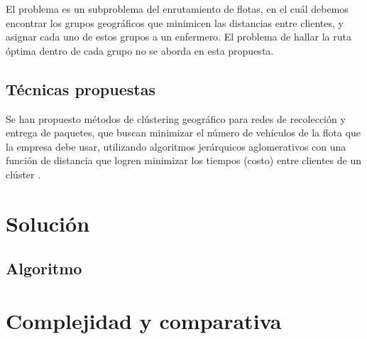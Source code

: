 \documentclass[runningheads]{llncs}
\begin{document}
El problema es un subproblema del enrutamiento de flotas, en el cuál debemos encontrar
los grupos geográficos que minimicen las distancias entre clientes, y asignar cada uno
de estos grupos a un enfermero. El problema de hallar la ruta óptima dentro de cada
grupo no se aborda en esta propuesta.
\subsection{Técnicas propuestas}
Se han propuesto métodos de clústering geográfico para redes de recolección y entrega
de paquetes, que buscan minimizar el número de vehículos de la flota que
la empresa debe usar, utilizando algoritmos jerárquicos aglomerativos con una función
de distancia que logren minimizar los tiempos (costo) entre clientes de
un clúster \cite{bard11}.
\section{Solución}
\subsection{Algoritmo}
\section{Complejidad y comparativa}
%
%
%


\end{document}
